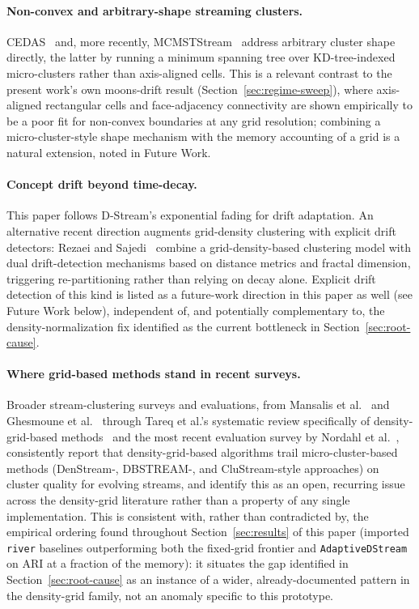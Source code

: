 \documentclass[11pt]{article}
\begin{document}
\paragraph{Non-convex and arbitrary-shape streaming clusters.} CEDAS~\cite{Hyde2017CEDAS} and, more recently, MCMSTStream~\cite{Erdinc2024MCMSTStream} address arbitrary cluster shape directly, the latter by running a minimum spanning tree over KD-tree-indexed micro-clusters rather than axis-aligned cells. This is a relevant contrast to the present work's own moons-drift result (Section~\ref{sec:regime-sweep}), where axis-aligned rectangular cells and face-adjacency connectivity are shown empirically to be a poor fit for non-convex boundaries at any grid resolution; combining a micro-cluster-style shape mechanism with the memory accounting of a grid is a natural extension, noted in Future Work.

\paragraph{Concept drift beyond time-decay.} This paper follows D-Stream's exponential fading for drift adaptation. An alternative recent direction augments grid-density clustering with explicit drift detectors: Rezaei and Sajedi~\cite{Rezaei2025FractalDrift} combine a grid-density-based clustering model with dual drift-detection mechanisms based on distance metrics and fractal dimension, triggering re-partitioning rather than relying on decay alone. Explicit drift detection of this kind is listed as a future-work direction in this paper as well (see Future Work below), independent of, and potentially complementary to, the density-normalization fix identified as the current bottleneck in Section~\ref{sec:root-cause}.

\paragraph{Where grid-based methods stand in recent surveys.} Broader stream-clustering surveys and evaluations, from Mansalis et al.~\cite{Mansalis2018Evaluation} and Ghesmoune et al.~\cite{Ghesmoune2020Review} through Tareq et al.'s systematic review specifically of density-grid-based methods~\cite{Tareq2022SystematicReview} and the most recent evaluation survey by Nordahl et al.~\cite{Nordahl2025EvaluationSurvey}, consistently report that density-grid-based algorithms trail micro-cluster-based methods (DenStream-, DBSTREAM-, and CluStream-style approaches) on cluster quality for evolving streams, and identify this as an open, recurring issue across the density-grid literature rather than a property of any single implementation. This is consistent with, rather than contradicted by, the empirical ordering found throughout Section~\ref{sec:results} of this paper (imported \texttt{river} baselines outperforming both the fixed-grid frontier and \texttt{AdaptiveDStream} on ARI at a fraction of the memory): it situates the gap identified in Section~\ref{sec:root-cause} as an instance of a wider, already-documented pattern in the density-grid family, not an anomaly specific to this prototype.
\end{document}
